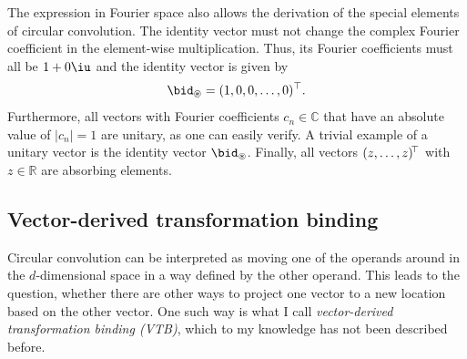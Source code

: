 The expression in Fourier space also allows the derivation of the special elements of circular convolution.
The identity vector must not change the complex Fourier coefficient in the element-wise multiplication.
Thus, its Fourier coefficients must all be $1 + 0\iu$ and the identity vector is given by
\begin{equation}
    \bid_{\circledast} = (1, 0, 0, \dotsc, 0)\Tr \text{.}
\end{equation}
Furthermore, all vectors with Fourier coefficients $c_n \in \mathbb{C}$ that have an absolute value of $\left|c_n\right| = 1$ are unitary, as one can easily verify.
A trivial example of a unitary vector is the identity vector $\bid_{\circledast}$.
Finally, all vectors $(z, \dotsc, z)\!^{\top}$ with $z \in \mathbb{R}$ are absorbing elements.

\subsection{Vector-derived transformation binding}
Circular convolution can be interpreted as moving one of the operands around in the $d$-dimensional space in a way defined by the other operand.
This leads to the question, whether there are other ways to project one vector to a new location based on the other vector.
One such way is what I call \emph{vector-derived transformation binding (VTB)}, which to my knowledge has not been described before.
